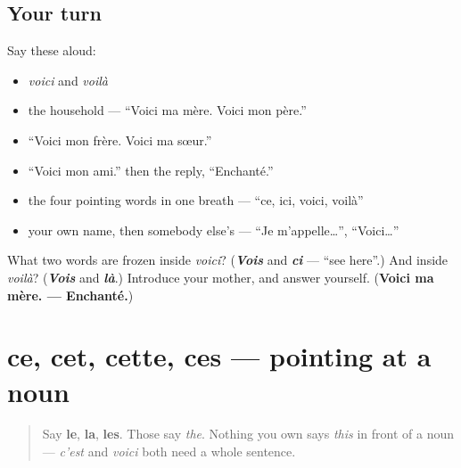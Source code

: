 \subsection*{Your turn}
Say these aloud:

\begin{itemize}
\raggedright
  \item \emph{voici} and \emph{voilà}
  \item the household — \textquotedblleft{}Voici ma mère. Voici mon père.\textquotedblright{}
  \item \textquotedblleft{}Voici mon frère. Voici ma sœur.\textquotedblright{}
  \item \textquotedblleft{}Voici mon ami.\textquotedblright{} then the reply, \textquotedblleft{}Enchanté.\textquotedblright{}
  \item the four pointing words in one breath — \textquotedblleft{}ce, ici, voici, voilà\textquotedblright{}
  \item your own name, then somebody else's — \textquotedblleft{}Je m'appelle…\textquotedblright{}, \textquotedblleft{}Voici…\textquotedblright{}
\end{itemize}

\begin{tcolorbox}[breakable,colback=teal!4,colframe=teal!35!black,title={Before you move on}]
What two words are frozen inside \emph{voici}? (\emph{\textbf{Vois}} and \emph{\textbf{ci}} — \textquotedblleft{}see here\textquotedblright{}.) And inside \emph{voilà}? (\emph{\textbf{Vois}} and \emph{\textbf{là}}.) Introduce your mother, and answer yourself. (\textbf{Voici ma mère. — Enchanté.})
\end{tcolorbox}
\section[ce, cet, cette, ces]{ce, cet, cette, ces — pointing at a noun}

\label{lesson:FR-C34-ce-cette}



\begin{quote}
Say \textbf{le}, \textbf{la}, \textbf{les}. Those say \emph{the}. Nothing you own says \emph{this} in front of a noun — \emph{c'est} and \emph{voici} both need a whole sentence.
\end{quote}

